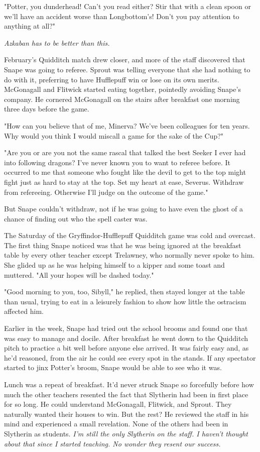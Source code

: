"Potter, you dunderhead! Can't you read either? Stir that with a clean spoon or we'll have an accident worse than Longbottom's! Don't you pay attention to anything at all?"

\emph{Azkaban has to be better than this.}

February's Quidditch match drew closer, and more of the staff discovered that Snape was going to referee. Sprout was telling everyone that she had nothing to do with it, preferring to have Hufflepuff win or lose on its own merits. McGonagall and Flitwick started eating together, pointedly avoiding Snape's company. He cornered McGonagall on the stairs after breakfast one morning three days before the game.

"How can you believe that of me, Minerva? We've been colleagues for ten years. Why would you think I would miscall a game for the sake of the Cup?"

"Are you or are you not the same rascal that talked the best Seeker I ever had into following dragons? I've never known you to want to referee before. It occurred to me that someone who fought like the devil to get to the top might fight just as hard to stay at the top. Set my heart at ease, Severus. Withdraw from refereeing. Otherwise I'll judge on the outcome of the game."

But Snape couldn't withdraw, not if he was going to have even the ghost of a chance of finding out who the spell caster was.

The Saturday of the Gryffindor-Hufflepuff Quidditch game was cold and overcast. The first thing Snape noticed was that he was being ignored at the breakfast table by every other teacher except Trelawney, who normally never spoke to him. She glided up as he was helping himself to a kipper and some toast and muttered. "All your hopes will be dashed today."

"Good morning to you, too, Sibyll," he replied, then stayed longer at the table than usual, trying to eat in a leisurely fashion to show how little the ostracism affected him.

Earlier in the week, Snape had tried out the school brooms and found one that was easy to manage and docile. After breakfast he went down to the Quidditch pitch to practice a bit well before anyone else arrived. It was fairly easy and, as he'd reasoned, from the air he could see every spot in the stands. If any spectator started to jinx Potter's broom, Snape would be able to see who it was.

Lunch was a repeat of breakfast. It'd never struck Snape so forcefully before how much the other teachers resented the fact that Slytherin had been in first place for so long. He could understand McGonagall, Flitwick, and Sprout. They naturally wanted their houses to win. But the rest? He reviewed the staff in his mind and experienced a small revelation. None of the others had been in Slytherin as students. \emph{I'm still the only Slytherin on the staff. I haven't thought about that since I started teaching. No wonder they resent our success.}

